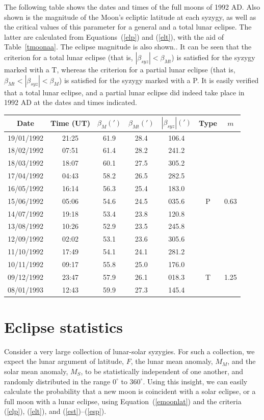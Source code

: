 The following table shows the dates and times of the full moons
of 1992 AD. Also shown is the magnitude of the Moon's ecliptic latitude
at each syzygy, as well as the critical values of
this parameter for a general and a total lunar eclipse. The latter are calculated from
Equations~(\ref{elp}) and (\ref{elt}), with the aid of Table~\ref{tmoonaa}.  The eclipse magnitude is also shown.. It can be seen that
the criterion for a total lunar eclipse (that is, $|\beta_{syz}|< \beta_{Mt}$) is satisfied for the syzygy  marked with a T, whereas
the criterion for a partial lunar eclipse  (that is, $\beta_{Mt}<|\beta_{syz}|< \beta_{M}$) is satisfied for the syzygy marked with a P. It is easily verified
that a total lunar eclipse, and a partial lunar eclipse did indeed
take place in 1992 AD at the dates and times indicated.

\begin{center}
\begin{tabular}{ccccccc}
Date & Time (UT) & $\beta_{M}(')$ & $\beta_{Mt}(')$ & $|\beta_{syz}|(')$& Type & $m$\\\hline
19/01/1992 &  21:25 & 61.9 & 28.4 & 106.4 &   &\\
18/02/1992 &  07:51 & 61.4 & 28.2 & 241.2 &   &\\
18/03/1992 &  18:07 & 60.1 & 27.5 & 305.2 &   &\\
17/04/1992 &  04:43 & 58.2 & 26.5 & 282.5 &   &\\
16/05/1992 &  16:14 & 56.3 & 25.4 & 183.0 &   &\\
15/06/1992 &  05:06 & 54.6 & 24.5 & 035.6 & P & 0.63\\
14/07/1992 &  19:18 & 53.4 & 23.8 & 120.8 &   &\\
13/08/1992 &  10:26 & 52.9 & 23.5 & 245.8 &   &\\
12/09/1992 &  02:02 & 53.1 & 23.6 & 305.6 &   &\\
11/10/1992 &  17:49 & 54.1 & 24.1 & 281.2 &   &\\
10/11/1992 &  09:17 & 55.8 & 25.0 & 176.0 &   &\\
09/12/1992 &  23:47 & 57.9 & 26.1 & 018.3 & T & 1.25\\
08/01/1993 &  12:43 & 59.9 & 27.3 & 145.4 &   &\\
\end{tabular}
\end{center}

\section{Eclipse statistics}
Consider a very large collection of lunar-solar syzygies. For such a collection,
we expect the lunar argument of latitude, $F$, the lunar mean anomaly, $M_M$,
and the solar mean anomaly, $M_S$, to be statistically independent of one another, and randomly distributed in
the range $0^\circ$ to $360^\circ$. Using this
insight, we can easily calculate the probability that a new moon is coincident with a
solar eclipse, or a full moon with a lunar eclipse, using Equation~(\ref{emoonlat})
and the criteria (\ref{elp}), (\ref{elt}), and (\ref{est})--(\ref{esp}).

